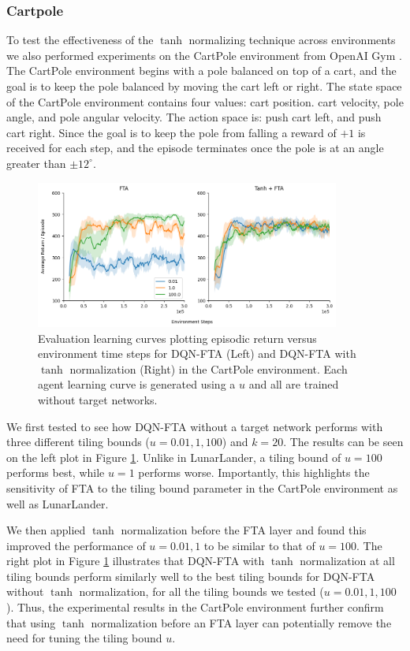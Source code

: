 \documentclass{article}
\begin{document}
\subsubsection{Cartpole}
To test the effectiveness of the $\tanh$ normalizing technique across environments we also performed experiments on the CartPole environment from OpenAI Gym \cite{brockman2016gym}.
The CartPole environment begins with a pole balanced on top of a cart, and the goal is to keep the pole balanced by moving the cart left or right.
The state space of the CartPole environment contains four values: cart position. cart velocity, pole angle, and pole angular velocity. 
The action space is: push cart left, and push cart right.
Since the goal is to keep the pole from falling a reward of $+1$ is received for each step, and the episode terminates once the pole is at an angle greater than $\pm 12^\circ$.

\begin{figure}[h]
    \centering
    \includegraphics[width=10cm]{cartpole.png}
    \caption{Evaluation learning curves plotting episodic return versus environment time steps for DQN-FTA (Left) and DQN-FTA with $\tanh$ normalization (Right) in the CartPole environment. Each agent learning curve is generated using a $u$ and all are trained without target networks.}
    \label{fig:cartpole}
\end{figure}

We first tested to see how DQN-FTA without a target network performs with three different tiling bounds ($u=0.01, 1, 100$) and $k=20$.
The results can be seen on the left plot in Figure \ref{fig:cartpole}. 
Unlike in LunarLander, a tiling bound of $u=100$ performs best, while $u=1$ performs worse.
Importantly, this highlights the sensitivity of FTA to the tiling bound parameter in the CartPole environment as well as LunarLander.

We then applied $\tanh$ normalization before the FTA layer and found this improved the performance of $u=0.01, 1$ to be similar to that of $u=100$.
The right plot in Figure \ref{fig:cartpole} illustrates that DQN-FTA with $\tanh$ normalization at all tiling bounds perform similarly well to the best tiling bounds for DQN-FTA without $\tanh$ normalization, for all the tiling bounds we tested ($u=0.01, 1, 100$).
Thus, the experimental results in the CartPole environment further confirm that using $\tanh$ normalization before an FTA layer can potentially remove the need for tuning the tiling bound $u$.
\end{document}
